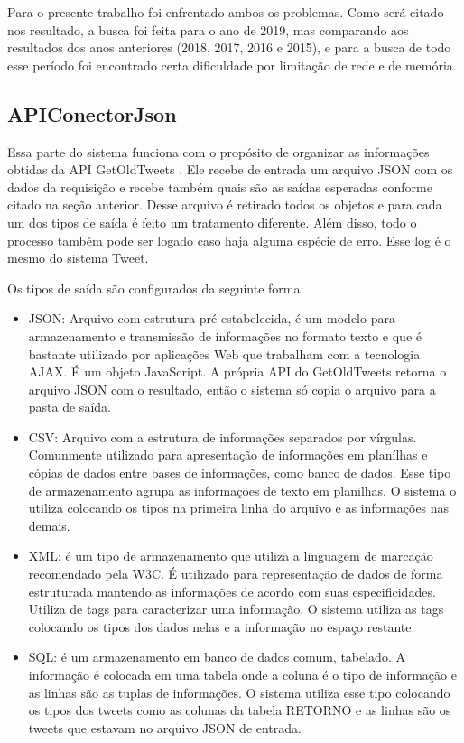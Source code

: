 Para o presente trabalho foi enfrentado ambos os problemas. Como será citado nos resultado, a busca foi feita para o ano de 2019, mas comparando aos resultados dos anos anteriores (2018, 2017, 2016 e 2015), e para a busca de todo esse período foi encontrado certa dificuldade por limitação de rede e de memória.

\subsection{APIConectorJson}

Essa parte do sistema funciona com o propósito de organizar as informações obtidas da API GetOldTweets \cite{Pythoncommunity}. Ele recebe de entrada um arquivo JSON com os dados da requisição e recebe também quais são as saídas esperadas conforme citado na seção anterior. Desse arquivo é retirado todos os objetos e para cada um dos tipos de saída é feito um tratamento diferente. Além disso, todo o processo também pode ser logado caso haja alguma espécie de erro. Esse log é o mesmo do sistema Tweet.

Os tipos de saída são configurados da seguinte forma:

\begin{itemize}
\item JSON: Arquivo com estrutura pré estabelecida, é um modelo para armazenamento e transmissão de informações no formato texto e que é bastante utilizado por aplicações Web que trabalham com a tecnologia AJAX. É um objeto JavaScript. A própria API do GetOldTweets \cite{Pythoncommunity} retorna o arquivo JSON com o resultado, então o sistema só copia o arquivo para a pasta de saída.  
\item CSV: Arquivo com a estrutura de informações separados por vírgulas. Comunmente utilizado para apresentação de informações em planílhas e cópias de dados entre bases de informações, como banco de dados. Esse tipo de armazenamento agrupa as informações de texto em planilhas. O sistema o utiliza colocando os tipos na primeira linha do arquivo e as informações nas demais.
\item XML: é um tipo de armazenamento que utiliza a linguagem de marcação recomendado pela W3C. É utilizado para representação de dados de forma estruturada mantendo as informações de acordo com suas especificidades. Utiliza de tags para caracterizar uma informação. O sistema utiliza as tags colocando os tipos dos dados nelas e a informação no espaço restante.
\item SQL: é um armazenamento em banco de dados comum, tabelado. A informação é colocada em uma tabela onde a coluna é o tipo de informação e as linhas são as tuplas de informações. O sistema utiliza esse tipo colocando os tipos dos tweets como as colunas da tabela RETORNO e as linhas são os tweets que estavam no arquivo JSON de entrada.
\end{itemize}

